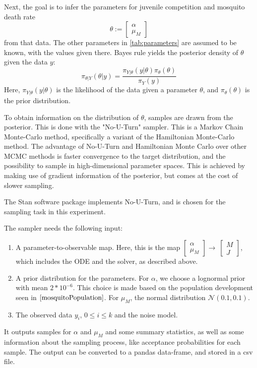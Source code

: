 \documentclass{article}
\begin{document}
Next, the goal is to infer the parameters for juvenile competition and mosquito death rate 
\[\theta:=\begin{bmatrix}\alpha \\ \mu_M\end{bmatrix}\] 
from that data. The other parameters in \ref{tab:parameters} are assumed to be known, with the values given there. 
Bayes rule yields the posterior density of $\theta$ given the data $y$:
\[\pi_{\theta|Y}(\theta|y) = \frac{\pi_{Y|\theta}(y|\theta)\pi_{\theta}(\theta)}{\pi_{Y}(y)}\]
Here, $\pi_{Y|\theta}(y|\theta)$ is the likelihood of the data given a parameter $\theta$, and $\pi_{\theta}(\theta)$ is the prior distribution.


To obtain information on the distribution of $\theta$, samples are drawn from the posterior. This is done with the "No-U-Turn" sampler. This is a Markov Chain Monte-Carlo method, specifically a variant of the Hamiltonian Monte-Carlo method. The advantage of No-U-Turn and Hamiltonian Monte Carlo over other MCMC methods is faster convergence to the target distribution, and the possibility to sample in high-dimensional parameter spaces. This is achieved by making use of gradient information of the posterior, but comes at the cost of slower sampling.

The Stan software package \cite{Stan} implements No-U-Turn, and is chosen for the sampling task in this experiment. 


The sampler needs the following input:
\begin{enumerate}
\item A parameter-to-observable map. Here, this is the map $\begin{bmatrix} \alpha \\ \mu_M\end{bmatrix}\rightarrow \ \begin{bmatrix}M\\J\end{bmatrix}$, which includes the ODE and the solver, as described above.
\item A prior distribution for the parameters. For $\alpha$, we choose a lognormal prior with mean $2*10^{-6}$. This choice is made based on the population development seen in $\ref{mosquitoPopulation}$. For $\mu_M$, the normal distribution $\mathcal{N}(0.1,0.1)$. 
\item The observed data $y_i$, $0 \leq i \leq k$ and the noise model.
\end{enumerate}

It outputs samples for $\alpha$ and $\mu_M$ and some summary statistics, as well as some information about the sampling process, like acceptance probabilities for each sample. The output can be converted to a pandas data-frame, and stored in a csv file.
\end{document}
